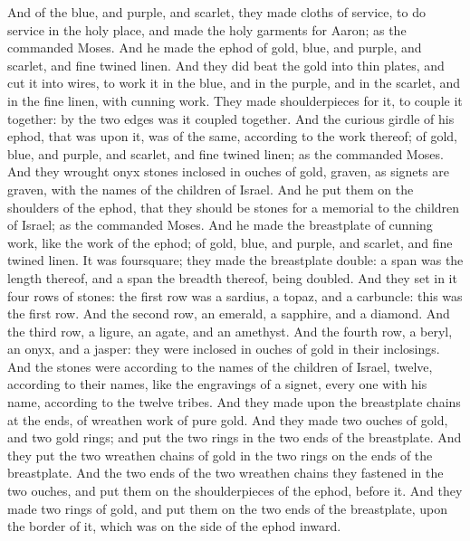 \begin{biblechapter} %
 And of the blue, and purple, and scarlet, they made cloths of service, to do service in the holy place, and made the holy garments for Aaron; as the \LORD commanded Moses.
 And he made the ephod of gold, blue, and purple, and scarlet, and fine twined linen.
\verse And they did beat the gold into thin plates, and cut it into wires, to work it in the blue, and in the purple, and in the scarlet, and in the fine linen, with cunning work.
\verse They made shoulderpieces for it, to couple it together: by the two edges was it coupled together.
\verse And the curious girdle of his ephod, that was upon it, was of the same, according to the work thereof; of gold, blue, and purple, and scarlet, and fine twined linen; as the \LORD commanded Moses.
\verse And they wrought onyx stones inclosed in ouches of gold, graven, as signets are graven, with the names of the children of Israel.
\verse And he put them on the shoulders of the ephod, that they should be stones for a memorial to the children of Israel; as the \LORD commanded Moses.
 And he made the breastplate of cunning work, like the work of the ephod; of gold, blue, and purple, and scarlet, and fine twined linen.
\verse It was foursquare; they made the breastplate double: a span was the length thereof, and a span the breadth thereof, being doubled.
\verse And they set in it four rows of stones: the first row was a sardius, a topaz, and a carbuncle: this was the first row.
\verse And the second row, an emerald, a sapphire, and a diamond.
\verse And the third row, a ligure, an agate, and an amethyst.
\verse And the fourth row, a beryl, an onyx, and a jasper: they were inclosed in ouches of gold in their inclosings.
\verse And the stones were according to the names of the children of Israel, twelve, according to their names, like the engravings of a signet, every one with his name, according to the twelve tribes.
\verse And they made upon the breastplate chains at the ends, of wreathen work of pure gold.
\verse And they made two ouches of gold, and two gold rings; and put the two rings in the two ends of the breastplate.
\verse And they put the two wreathen chains of gold in the two rings on the ends of the breastplate.
\verse And the two ends of the two wreathen chains they fastened in the two ouches, and put them on the shoulderpieces of the ephod, before it.
\verse And they made two rings of gold, and put them on the two ends of the breastplate, upon the border of it, which was on the side of the ephod inward.

\end{biblechapter}
